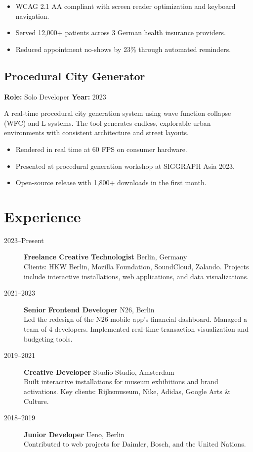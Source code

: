 \documentclass[
    language=english,
    doctype=personal-portfolio,
    institution=none,
]{../../omnilatex}
\begin{document}
\begin{itemize}
    \item WCAG 2.1 AA compliant with screen reader optimization and keyboard navigation.
    \item Served 12,000+ patients across 3 German health insurance providers.
    \item Reduced appointment no-shows by 23\% through automated reminders.
\end{itemize}

\subsection{Procedural City Generator}

\textbf{Role:} Solo Developer \hfill \textbf{Year:} 2023

A real-time procedural city generation system using wave function collapse (WFC) and L-systems. The tool generates endless, explorable urban environments with consistent architecture and street layouts.

\begin{itemize}
    \item Rendered in real time at 60 FPS on consumer hardware.
    \item Presented at procedural generation workshop at SIGGRAPH Asia 2023.
    \item Open-source release with 1,800+ downloads in the first month.
\end{itemize}

\section{Experience}

\begin{description}
    \item[2023--Present] \textbf{Freelance Creative Technologist} \hfill Berlin, Germany \\
    Clients: HKW Berlin, Mozilla Foundation, SoundCloud, Zalando.
    Projects include interactive installations, web applications, and data visualizations.

    \item[2021--2023] \textbf{Senior Frontend Developer} \hfill N26, Berlin \\
    Led the redesign of the N26 mobile app's financial dashboard. Managed a team of 4 developers.
    Implemented real-time transaction visualization and budgeting tools.

    \item[2019--2021] \textbf{Creative Developer} \hfill Studio Studio, Amsterdam \\
    Built interactive installations for museum exhibitions and brand activations.
    Key clients: Rijksmuseum, Nike, Adidas, Google Arts \& Culture.

    \item[2018--2019] \textbf{Junior Developer} \hfill Ueno, Berlin \\
    Contributed to web projects for Daimler, Bosch, and the United Nations.
\end{description}
\end{document}
